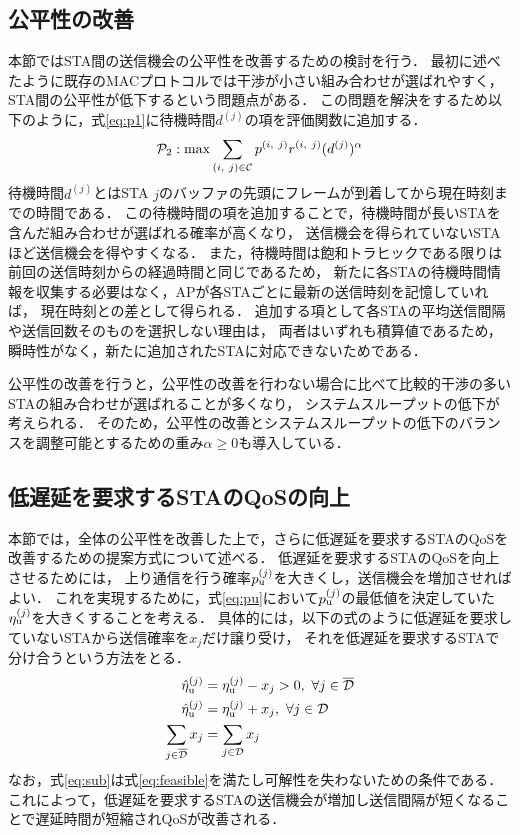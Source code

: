 \documentclass[technicalreport]{ieicej}
\newcommand{\etau}{\eta_{\rm u}^{(j)}}
\begin{document}
\subsection{公平性の改善}\label{sec:fair}
	本節ではSTA間の送信機会の公平性を改善するための検討を行う．
	最初に述べたように既存のMACプロトコルでは干渉が小さい組み合わせが選ばれやすく，
	STA間の公平性が低下するという問題点がある．
	この問題を解決をするため以下のように，式\eqref{eq:p1}に待機時間$d^{(j)}$の項を評価関数に追加する．
	\begin{equation}
		{\mathcal P}_2: {\rm max} \sum_{(i,\ j)\in{\mathcal C}} p^{(i,\ j)}r^{(i,\ j)}(d^{(j)})^{\alpha} \label{eq:p2}
	\end{equation}
	待機時間$d^{(j)}$とはSTA $j$のバッファの先頭にフレームが到着してから現在時刻までの時間である．
	この待機時間の項を追加することで，待機時間が長いSTAを含んだ組み合わせが選ばれる確率が高くなり，
	送信機会を得られていないSTAほど送信機会を得やすくなる．
	また，待機時間は飽和トラヒックである限りは前回の送信時刻からの経過時間と同じであるため，
	新たに各STAの待機時間情報を収集する必要はなく，APが各STAごとに最新の送信時刻を記憶していれば，
	現在時刻との差として得られる．
	追加する項として各STAの平均送信間隔や送信回数そのものを選択しない理由は，
	両者はいずれも積算値であるため，瞬時性がなく，新たに追加されたSTAに対応できないためである．
	\par
	公平性の改善を行うと，公平性の改善を行わない場合に比べて比較的干渉の多いSTAの組み合わせが選ばれることが多くなり，
	システムスループットの低下が考えられる．
	そのため，公平性の改善とシステムスループットの低下のバランスを調整可能とするための重み$\alpha\geq 0$も導入している．
\subsection{低遅延を要求するSTAのQoSの向上}
	本節では，全体の公平性を改善した上で，さらに低遅延を要求するSTAのQoSを改善するための提案方式について述べる．
	低遅延を要求するSTAのQoSを向上させるためには，
	上り通信を行う確率$p_{\rm u}^{(j)}$を大きくし，送信機会を増加させればよい．
	これを実現するために，式\eqref{eq:pu}において$p_{\rm u}^{(j)}$の最低値を決定していた$\etau$を大きくすることを考える．
	具体的には，以下の式のように低遅延を要求していないSTAから送信確率を$x_j$だけ譲り受け，
	それを低遅延を要求するSTAで分け合うという方法をとる．
	\begin{align}
		{\hat \eta}_{\rm u}^{(j)} &= \etau -x_j > 0,\ \forall j \in {\overline {\mathcal D}} \label{eq:etadbar}\\
		{\hat \eta}_{\rm u}^{(j)} &= \etau + x_j, \ \forall j \in {\mathcal D} \label{eq:etad}\\
		\sum_{j\in{\overline {\mathcal D}}} x_j &= \sum_{j\in{\mathcal D}} x_j \label{eq:sub}
	\end{align}
	なお，式\eqref{eq:sub}は式\eqref{eq:feasible}を満たし可解性を失わないための条件である．
	これによって，低遅延を要求するSTAの送信機会が増加し送信間隔が短くなることで遅延時間が短縮されQoSが改善される．
\end{document}
